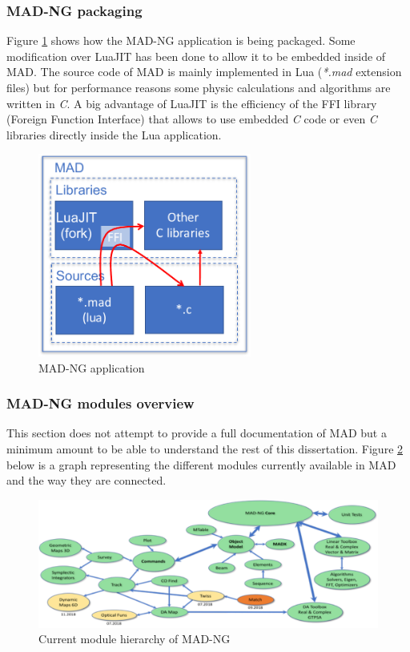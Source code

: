 \subsubsection{MAD-NG packaging}
\label{Subsec:mad-pk}

Figure \ref{fig:mad} shows how the MAD-NG application is being packaged. Some
modification over LuaJIT has been done to allow it to be embedded inside of MAD.
The source code of MAD is mainly implemented in Lua (\emph{*.mad} extension
files) but for performance reasons some physic calculations and algorithms are
written in \emph{C}. A big advantage of LuaJIT is the efficiency of the FFI
library (Foreign Function Interface) that allows to use embedded \emph{C} code
or even \emph{C} libraries directly inside the Lua application.

\begin{figure}[H]
    \centering
	\includegraphics[width=7cm]{./Images/MAD.pdf}
    \caption{MAD-NG application}
    \label{fig:mad}
\end{figure}

\subsubsection{MAD-NG modules overview}
\label{Subsec:mad-doc}

This section does not attempt to provide a full documentation of MAD but a
minimum amount to be able to understand the rest of this dissertation.
Figure \ref{fig:mad-graph} below is a graph representing the different
modules currently available in MAD and the way they are connected.

\begin{figure}[H]
    \centering
	\includegraphics[width=\textwidth]{./Images/mad-graph.pdf}
    \caption{Current module hierarchy of MAD-NG}
    \label{fig:mad-graph}
\end{figure}

